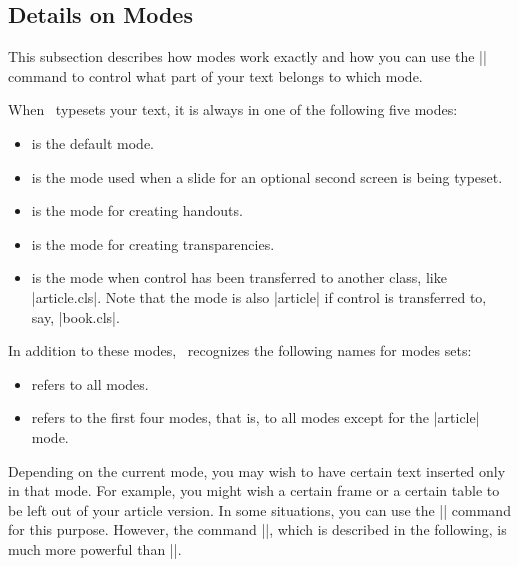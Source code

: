\subsection{Details on Modes}
\label{section-mode-details}

This subsection describes how modes work exactly and how you can use the |\mode| command to control what part of your text belongs to which mode.

When \beamer\ typesets your text, it is always in one of the following five modes:
\begin{itemize}
\item
   is the default mode.
\item
   is the mode used when a slide for an optional second screen is being typeset.
\item
   is the mode for creating handouts.
\item
   is the mode for creating transparencies.
\item
   is the mode when control has been transferred to another class, like |article.cls|. Note that the mode is also |article| if control is transferred to, say, |book.cls|.
\end{itemize}

In addition to these modes, \beamer\ recognizes the following names for modes sets:

\begin{itemize}
\item
   refers to all modes.
\item
   refers to the first four modes, that is, to all modes except for the |article| mode.
\end{itemize}

\begin{center}
\end{center}

Depending on the current mode, you may wish to have certain text inserted only in that mode. For example, you might wish a certain frame or a certain table to be left out of your article version. In some situations, you can use the |\only| command for this purpose. However, the command |\mode|, which is described in the following, is much more powerful than |\only|.

